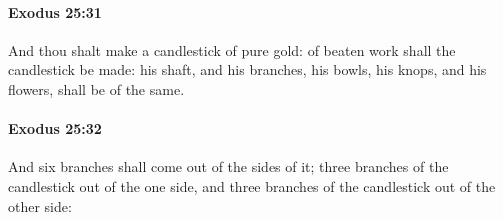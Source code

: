 		\paragraph{Exodus 25:31} %
			\label{EXODUS-25-31}

			And thou shalt make a candlestick of pure gold: of beaten work shall the candlestick be made: his shaft, and his branches, his bowls, his knops, and his flowers, shall be of the same.


		\paragraph{Exodus 25:32} %
			\label{EXODUS-25-32}

			And six branches shall come out of the sides of it; three branches of the candlestick out of the one side, and three branches of the candlestick out of the other side:


